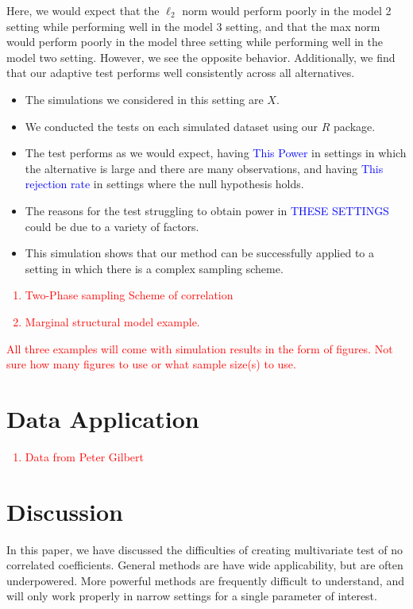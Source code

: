 \documentclass{article}
\newcommand{\sh}{\textcolor{red}}
\begin{document}
Here, we would expect that the $\ell_2$ norm would perform poorly in the model 2 setting while performing well in the model 3 setting, and that the max norm would perform poorly in the model three setting while performing well in the model two setting.  However, we see the opposite behavior.  Additionally, we find that our adaptive test performs well consistently across all alternatives. 

\begin{itemize}
	\item The simulations we considered in this setting are $X$.  
	\item We conducted the tests on each simulated dataset using our $R$ package.  
	\item The test performs as we would expect, having \textcolor{blue}{This Power} in settings in which the alternative is large and there are many observations, and having \textcolor{blue}{This rejection rate} in settings where the null hypothesis holds. 
	\item The reasons for the test struggling to obtain power in \textcolor{blue}{THESE SETTINGS} could be due to a variety of factors.
	\item This simulation shows that our method can be successfully applied to a setting in which there is a complex sampling scheme.
\end{itemize}


\sh{
\begin{enumerate}
	\item Two-Phase sampling Scheme of correlation
	\item Marginal structural model example.
\end{enumerate}
All three examples will come with simulation results in the form of figures.  Not sure how many figures to use or what sample size(s) to use.
}

\section{Data Application}

\sh{\begin{enumerate}
	\item Data from Peter Gilbert
\end{enumerate}
}

\section{Discussion}
In this paper, we have discussed the difficulties of creating multivariate test of no correlated coefficients.  General methods are have wide applicability, but are often underpowered.  More powerful methods are frequently difficult to understand, and will only work properly in narrow settings for a single parameter of interest.  
\end{document}
